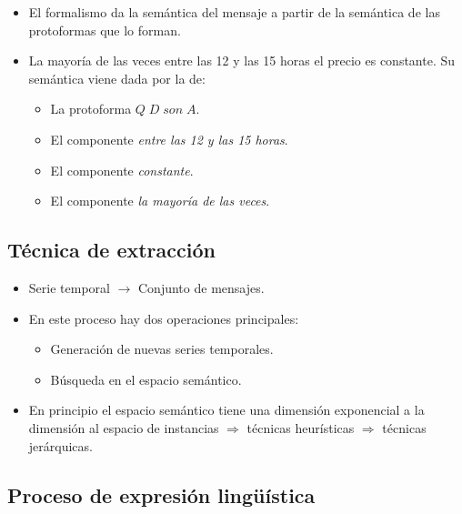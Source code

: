 \documentclass{beamer}
\begin{document}
	\begin{frame}
		\begin{itemize}
		\item El formalismo da la semántica del mensaje a partir de la semántica de las protoformas que lo forman.
		\item La mayoría de las veces entre las 12 y las 15 horas el precio es constante. Su semántica viene dada por la de:
			\begin{itemize}
				\item La protoforma $Q \; D \; son \; A$.
				\item El componente \textit{entre las 12 y las 15 horas}.
				\item El componente \textit{constante}.
				\item El componente \textit{la mayoría de las veces}.
			\end{itemize}
		\end{itemize}
	\end{frame}
	
	\subsection{Técnica de extracción}
	
	\begin{frame}
		\begin{itemize}
			\item Serie temporal $\longrightarrow$ Conjunto de mensajes.
			\item En este proceso hay dos operaciones principales:
				\begin{itemize}
					\item Generación de nuevas series temporales.
					\item Búsqueda en el espacio semántico.
				\end{itemize}
			\item En principio el espacio semántico tiene una dimensión exponencial a la dimensión al espacio de instancias $\Rightarrow$ técnicas heurísticas $\Rightarrow$ técnicas jerárquicas.
		\end{itemize}
	\end{frame}
	
	\subsection{Proceso de expresión lingüística}
	
\end{document}
